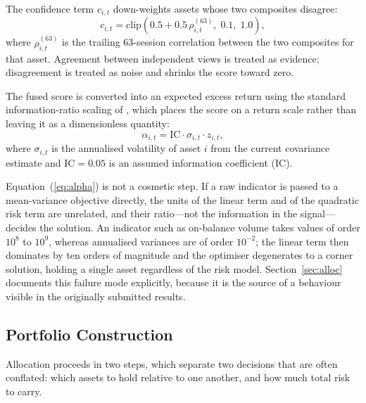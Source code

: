 \documentclass{singlecol-new}
\theoremstyle{TH}{
\newtheorem{lemma}{Lemma}
\newtheorem{theorem}[lemma]{Theorem}
\newtheorem{corrolary}[lemma]{Corrolary}
\newtheorem{conjecture}[lemma]{Conjecture}
\newtheorem{proposition}[lemma]{Proposition}
\newtheorem{claim}[lemma]{Claim}
\newtheorem{stheorem}[lemma]{Wrong Theorem}
\newtheorem{algorithm}{Algorithm}
}
\theoremstyle{THrm}{
\newtheorem{definition}{Definition}[section]
\newtheorem{question}{Question}[section]
\newtheorem{remark}{Remark}
\newtheorem{scheme}{Scheme}
}
\theoremstyle{THhit}{
\newtheorem{case}{Case}[section]
}
\begin{document}
The confidence term $c_{i,t}$ down-weights assets whose two composites disagree:
\begin{equation}
c_{i,t} = \mathrm{clip}\!\left(0.5 + 0.5\,\rho^{(63)}_{i,t}, \; 0.1, \; 1.0\right),
\end{equation}
where $\rho^{(63)}_{i,t}$ is the trailing 63-session correlation between the two
composites for that asset. Agreement between independent views is treated as evidence;
disagreement is treated as noise and shrinks the score toward zero.

The fused score is converted into an expected excess return using the standard
information-ratio scaling of \citet{grinold00}, which places the score on a return
scale rather than leaving it as a dimensionless quantity:
\begin{equation}
\alpha_{i,t} = \mathrm{IC} \cdot \sigma_{i,t} \cdot z_{i,t},
\label{eq:alpha}
\end{equation}
where $\sigma_{i,t}$ is the annualised volatility of asset $i$ from the current
covariance estimate and $\mathrm{IC} = 0.05$ is an assumed information coefficient (IC).

Equation~(\ref{eq:alpha}) is not a cosmetic step. If a raw indicator is passed to a
mean-variance objective directly, the units of the linear term and of the quadratic
risk term are unrelated, and their ratio---not the information in the signal---decides
the solution. An indicator such as on-balance volume takes values of order $10^{8}$ to
$10^{9}$, whereas annualised variances are of order $10^{-2}$; the linear term then
dominates by ten orders of magnitude and the optimiser degenerates to a corner
solution, holding a single asset regardless of the risk model. Section~\ref{sec:alloc}
documents this failure mode explicitly, because it is the source of a behaviour visible
in the originally submitted results.

\subsection{Portfolio Construction}

Allocation proceeds in two steps, which separate two decisions that are often conflated:
which assets to hold relative to one another, and how much total risk to carry.
\end{document}
